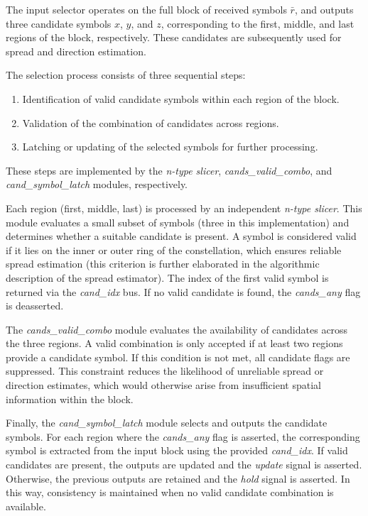 The input selector operates on the full block of received symbols $ \bar{r} $, and outputs three candidate symbols $x$, $y$, and $z$, 
corresponding to the first, middle, and last regions of the block, respectively. These candidates are subsequently used for spread and
direction estimation.

The selection process consists of three sequential steps:

\begin{enumerate}
    \item Identification of valid candidate symbols within each region of the block.
    \item Validation of the combination of candidates across regions.
    \item Latching or updating of the selected symbols for further processing.
\end{enumerate}

These steps are implemented by the \textit{n-type slicer}, \textit{cands\_valid\_combo}, and \textit{cand\_symbol\_latch} modules, respectively.

Each region (first, middle, last) is processed by an independent \textit{n-type slicer}. 
This module evaluates a small subset of symbols (three in this implementation) and determines 
whether a suitable candidate is present. A symbol is considered valid if it lies on the inner or 
outer ring of the constellation, which ensures reliable spread estimation (this criterion is further 
elaborated in the algorithmic description of the spread estimator). The index of the first valid symbol 
is returned via the \textit{cand\_idx} bus. If no valid candidate is found, the \textit{cands\_any} flag is deasserted.

The \textit{cands\_valid\_combo} module evaluates the availability of candidates across the three regions.
A valid combination is only accepted if at least two regions provide a candidate symbol. If this condition is not met,
 all candidate flags are suppressed. This constraint reduces the likelihood of unreliable spread or direction estimates, 
 which would otherwise arise from insufficient spatial information within the block.

Finally, the \textit{cand\_symbol\_latch} module selects and outputs the candidate symbols. For each region where the 
\textit{cands\_any} flag is asserted, the corresponding symbol is extracted from the input block using the provided 
\textit{cand\_idx}. If valid candidates are present, the outputs are updated and the \textit{update} signal is asserted. 
Otherwise, the previous outputs are retained and the \textit{hold} signal is asserted. In this way, consistency is maintained 
when no valid candidate combination is available.

